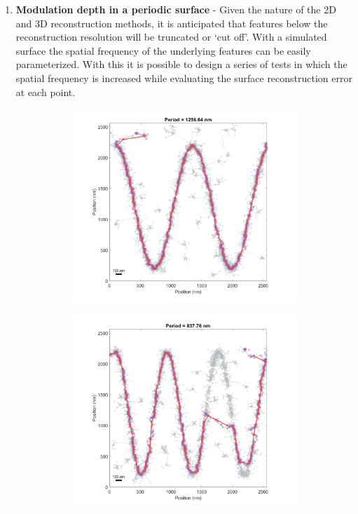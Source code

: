\documentclass[10pt,a4paper]{article}
\begin{document}
\begin{enumerate}
	\item \textbf{Modulation depth in a periodic surface} - Given the nature of the 2D and 3D reconstruction methods, it is anticipated that features below the reconstruction resolution will be truncated or `cut off'.  With a simulated surface the spatial frequency of the underlying features can be easily parameterized.  With this it is possible to design a series of tests in which the spatial frequency is increased while evaluating the surface reconstruction error at each point.  
	
	\begin{figure}
		\centering
		\begin{subfigure}[b]{.3\textwidth}
			\centering
			\includegraphics[width=\textwidth]{./figures/FitPoints2d_pts-400_period-1256.png}
			\caption[Step1]{}
			\label{fig:modDepth400_fDiv10}
		\end{subfigure}
		\begin{subfigure}[b]{.3\textwidth}
			\centering
			\includegraphics[width=\textwidth]{./figures/FitPoints2d_pts-400_period-837.png}

\end{subfigure}
\end{figure}
\end{enumerate}
\end{document}

